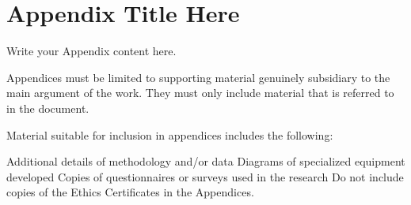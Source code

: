
\chapter{Appendix Title Here} %
\label{AppendixA} %

Write your Appendix content here.

Appendices must be limited to supporting material genuinely subsidiary to the main argument of the work. They must only include material that is referred to in the document.

Material suitable for inclusion in appendices includes the following:

Additional details of methodology and/or data
Diagrams of specialized equipment developed
Copies of questionnaires or surveys used in the research
Do not include copies of the Ethics Certificates in the Appendices.